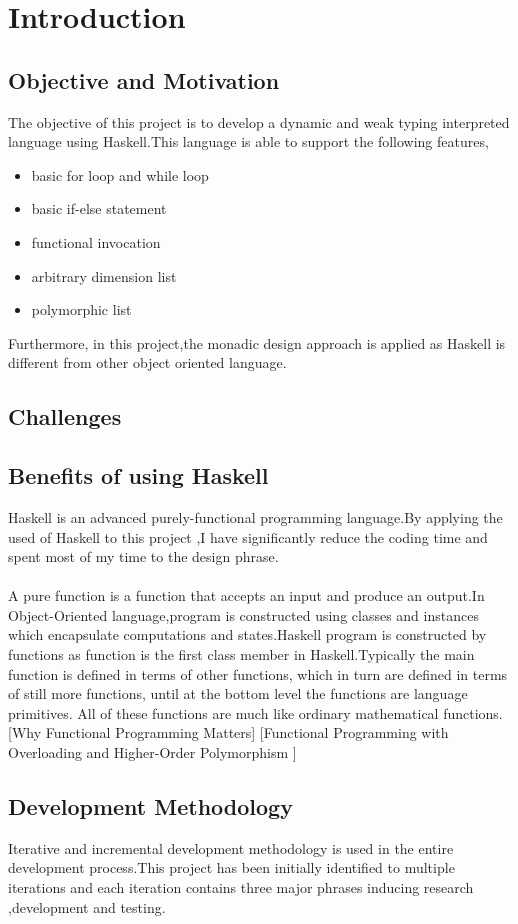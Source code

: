 \chapter{Introduction}
\section{Objective and Motivation}
The objective of this project is to develop a dynamic and weak typing interpreted language using Haskell.This language is able to support the following features,
\begin{itemize}
\item basic for loop and while loop
\item basic if-else statement
\item functional invocation 
\item arbitrary dimension list
\item polymorphic list
\end{itemize}

Furthermore, in this project,the monadic design approach is applied as Haskell is different from other object oriented language.


\section{Challenges}


\section{Benefits of using Haskell} 
Haskell is an advanced purely-functional programming language.By applying the used of Haskell to this project ,I have significantly reduce the coding time and spent most of my time to the design phrase.
\\
\\
A pure function is a function that accepts an input and produce an output.In Object-Oriented language,program is constructed using classes and instances which encapsulate computations and states.Haskell program is constructed by functions as function is the first class member in Haskell.Typically the main function is defined in terms of other functions, which in turn are defined in terms of still more functions, until at the bottom level the functions are language primitives. All of these functions are much like ordinary mathematical functions.
[Why Functional Programming Matters]
[Functional Programming with Overloading and
Higher-Order Polymorphism
]
\section{Development Methodology}
Iterative and incremental development methodology is used in the entire development process.This project has been initially identified to multiple iterations and each iteration contains three major phrases inducing research ,development and testing.\\

